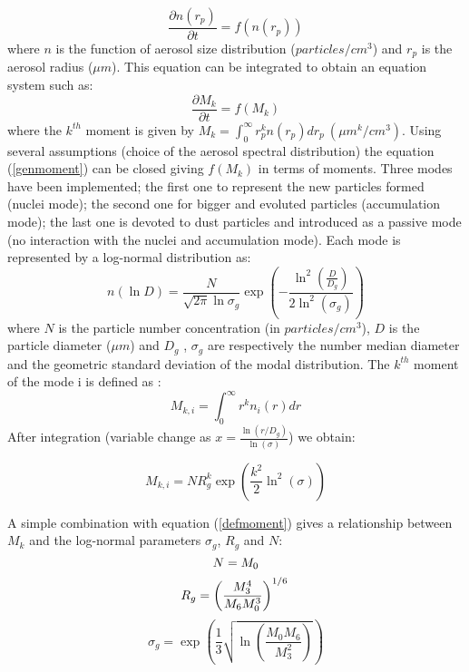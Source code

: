 \begin{equation}
\frac{\partial n(r_p)}{\partial t} = f(n(r_p))
\label{eqanal}
\end{equation}
where $n$ is the function of aerosol size distribution ($ particles / cm^3$) 
and $r_p$ is the aerosol radius ($\mu m$).
This equation can be integrated to obtain an equation system such as: 
\begin{equation}
\frac{\partial M_k}{\partial t} = f(M_k)
\label{genmoment}
\end{equation}
where the $k^{th}$ moment is given by $M_k = \int_{0}^{\infty} r_{p}^{k} n(r_p) 
dr_p \ (\mu m^k / cm^3) $.
Using several assumptions (choice of the aerosol spectral distribution) the 
equation (\ref{genmoment})
can be closed giving $f(M_k)$ in terms of moments.
Three modes have been implemented; the first one to represent the new particles 
formed (nuclei mode); the second one
for bigger and evoluted particles (accumulation mode); the last one is devoted to 
dust particles and introduced as a passive mode (no interaction with the nuclei and 
accumulation mode). Each mode is represented by a log-normal distribution as:
\begin{equation}
 n(\ln D) = \frac{N}{\sqrt{2 \pi} \ln{\sigma_g}} \exp \left(- \frac{\ln^2 (\frac{D}{D_g})}{2 \ln^2(\sigma_g)}\right) \label{distribution}
\end{equation}
where $N$ is the particle number concentration (in $ particles /cm^3$), $D$ is the particle diameter ($\mu m$) and $D_g$
, $\sigma_g$ are respectively the number median diameter and the geometric 
standard deviation of the modal distribution.
The $k^{th}$ moment of the mode i is defined as :
\begin{equation}
M_{k,i} = \int_{0}^{\infty} r^k n_i(r) dr
\label{defmomentint}
\end{equation}
After integration (variable change as $ x = \frac{\ln (r/D_g)}{\ln(\sigma)}$) we 
obtain:

\begin{equation}
M_{k,i} =  N R^{k}_g \exp \left(\frac{k^2}{2} \ln^2 (\sigma)\right)
\label{defmoment}
\end{equation}

A simple combination with equation (\ref{defmoment}) gives a relationship between 
$M_k$ and the log-normal parameters $\sigma_g$, $R_g$ and $N$:
\begin{equation}
N = M_0 \\
\label{number}
\end{equation}
\begin{equation}
R_g = \left( \frac{M_3^4}{M_6 M_0^3} \right)^{1/6} \\
\label{radius}
\end{equation}
\begin{equation}
\sigma_g = \exp \left( \frac{1}{3} \sqrt{\ln \left( \frac{M_0 M_6}{M_3^2} 
\right)} \right)
\label{sigma}
\end{equation}


